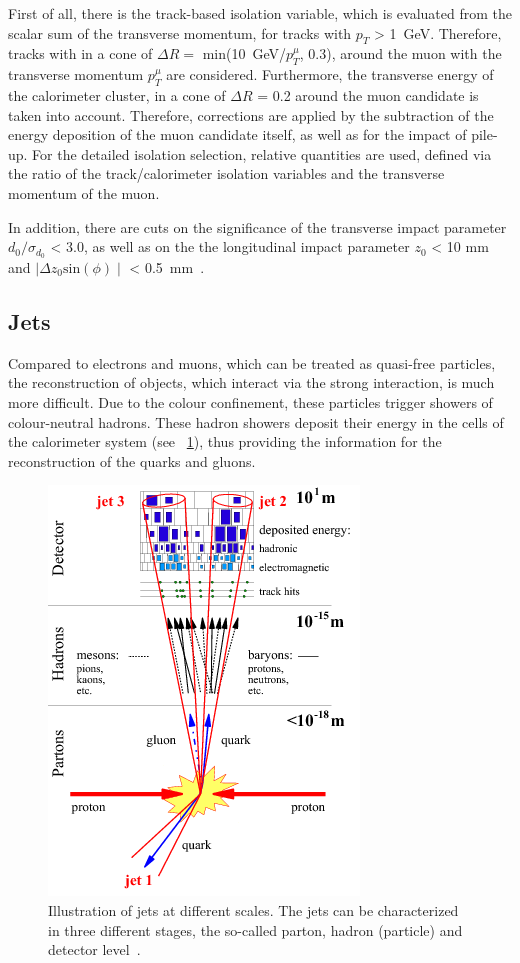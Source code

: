  First of all, there is the track-based isolation variable, which is evaluated from the scalar sum of the transverse momentum, for tracks with $p_T$ > 1~GeV. Therefore, tracks with in a cone of $\Delta R =$ min(10~GeV/$p_T^{\mu}$, 0.3), around the muon with the transverse momentum $p_T^{\mu}$ are considered. Furthermore, the transverse energy of the calorimeter cluster, in a cone of $\Delta R$ = 0.2 around the muon candidate is taken into account. Therefore, corrections are applied by the subtraction of the energy deposition of the muon candidate itself, as well as for the impact of pile-up. 
For the detailed isolation selection, relative quantities are  used,  defined via the ratio of  the track/calorimeter isolation variables and the transverse momentum of the muon.~\cite{Aad:2016jkr}

 In addition, there are cuts on the significance of the transverse impact parameter  $d_0/\sigma_{d_0}$ < 3.0, as well as on the the longitudinal impact parameter $z_0$ < 10 mm and $\mid \Delta z_0 \text{sin}(\phi) \mid$ < 0.5~mm~\cite{Aad:2016jkr}.



\subsection{Jets}
Compared to electrons and muons, which can be treated as quasi-free particles, the reconstruction of objects, which interact via the strong interaction, is much more difficult. Due to the colour confinement, these particles trigger showers of colour-neutral hadrons. These hadron showers deposit their energy in the cells of the calorimeter system (see ~\cref{fig:41}), thus providing the information for the reconstruction of the quarks and gluons.

\begin{figure}[h]
  	\centering
  	\includegraphics[width=0.4\linewidth]{Pics/cp4/41.png}
  	\caption{Illustration of jets at different scales. The jets can be characterized in three different stages, the so-called parton, hadron (particle) and detector level~\cite{Carli:2015qta}.}
   	\label{fig:41}
\end{figure}


